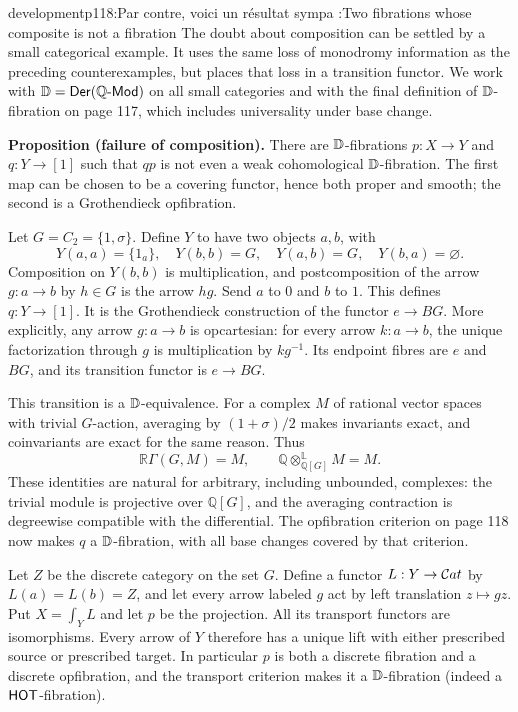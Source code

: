 \begin{dcomment}{development}{p118:Par contre, voici un résultat sympa :}{Two fibrations whose composite is not a fibration}
The doubt about composition can be settled by a small categorical example. It uses the same loss of monodromy information as the preceding counterexamples, but places that loss in a transition functor. We work with $\mathbb{D}=\mathsf{Der}(\mathbb Q\text{-}\mathsf{Mod})$ on all small categories and with the final definition of $\mathbb{D}$-fibration on page 117, which includes universality under base change.

\textbf{Proposition (failure of composition).}\ours
There are $\mathbb{D}$-fibrations $p:X\to Y$ and $q:Y\to[1]$ such that $qp$ is not even a weak cohomological $\mathbb{D}$-fibration. The first map can be chosen to be a covering functor, hence both proper and smooth; the second is a Grothendieck opfibration.

Let $G=C_2=\{1,\sigma\}$. Define $Y$ to have two objects $a,b$, with
\[
 Y(a,a)=\{1_a\},\quad Y(b,b)=G,\quad
 Y(a,b)=G,\quad Y(b,a)=\varnothing.
\]
Composition on $Y(b,b)$ is multiplication, and postcomposition of the arrow $g:a\to b$ by $h\in G$ is the arrow $hg$. Send $a$ to $0$ and $b$ to $1$. This defines $q:Y\to[1]$. It is the Grothendieck construction of the functor $e\to BG$. More explicitly, any arrow $g:a\to b$ is opcartesian: for every arrow $k:a\to b$, the unique factorization through $g$ is multiplication by $kg^{-1}$. Its endpoint fibres are $e$ and $BG$, and its transition functor is $e\to BG$.

This transition is a $\mathbb{D}$-equivalence. For a complex $M$ of rational vector spaces with trivial $G$-action, averaging by $(1+\sigma)/2$ makes invariants exact, and coinvariants are exact for the same reason. Thus
\[
 \mathbb R\Gamma(G,M)=M,
 \qquad \mathbb Q\mathbin{\otimes^{\mathbb L}_{\mathbb Q[G]}}M=M.
\]
These identities are natural for arbitrary, including unbounded, complexes: the trivial module is projective over $\mathbb Q[G]$, and the averaging contraction is degreewise compatible with the differential. The opfibration criterion on page 118 now makes $q$ a $\mathbb{D}$-fibration, with all base changes covered by that criterion.

Let $Z$ be the discrete category on the set $G$. Define a functor $L:Y\to\mathcal{C}at$ by $L(a)=L(b)=Z$, and let every arrow labeled $g$ act by left translation $z\mapsto gz$. Put $X=\int_Y L$ and let $p$ be the projection. All its transport functors are isomorphisms. Every arrow of $Y$ therefore has a unique lift with either prescribed source or prescribed target. In particular $p$ is both a discrete fibration and a discrete opfibration, and the transport criterion makes it a $\mathbb{D}$-fibration (indeed a $\mathsf{HOT}$-fibration).


\end{dcomment}
